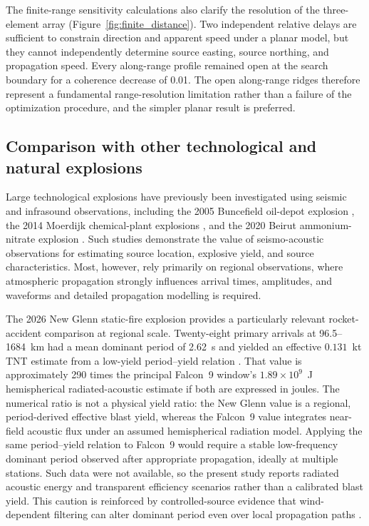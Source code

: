 \documentclass[]{seismica}
\begin{document}
The finite-range sensitivity calculations also clarify the resolution of the
three-element array (Figure~\ref{fig:finite_distance}). Two independent
relative delays are sufficient to constrain direction and apparent speed under
a planar model, but they cannot independently determine source easting, source
northing, and propagation speed. Every along-range profile remained open at
the search boundary for a coherence decrease of 0.01. The open along-range
ridges therefore represent a fundamental range-resolution limitation rather
than a failure of the optimization procedure, and the simpler planar result is
preferred.

\subsection{Comparison with other technological and natural explosions}
\label{sec:discussion_comparison}

Large technological explosions have previously been investigated using
seismic and infrasound observations, including the 2005 Buncefield oil-depot
explosion \citep{ottemoller_2008,green_2008,ceranna_2009}, the 2014 Moerdijk
chemical-plant explosions \citep{smink_2019}, and the 2020 Beirut
ammonium-nitrate explosion
\citep{pilger_beirut_2021,kim_pasyanos_2022}. Such studies demonstrate the value of seismo-acoustic observations for estimating source location, explosive yield, and source characteristics. Most, however, rely primarily on regional observations, where atmospheric propagation strongly influences arrival times, amplitudes, and waveforms and detailed propagation modelling is required.

The 2026 New Glenn static-fire explosion provides a particularly relevant
rocket-accident comparison at regional scale. Twenty-eight primary arrivals at
96.5--1684~km had a mean dominant period of 2.62~s and yielded an effective
$0.131$~kt TNT estimate from a low-yield period--yield relation
\citep{silber_scamfer_newglenn_2026}. That value is approximately 290 times the
principal Falcon~9 window's $1.89\times10^9$~J hemispherical radiated-acoustic
estimate if both are expressed in joules. The numerical ratio is not a physical
yield ratio: the New Glenn value is a regional, period-derived effective blast
yield, whereas the Falcon~9 value integrates near-field acoustic flux under an
assumed hemispherical radiation model. Applying the same period--yield relation
to Falcon~9 would require a stable low-frequency dominant period observed after
appropriate propagation, ideally at multiple stations. Such data were not
available, so the present study reports radiated acoustic energy and transparent
efficiency scenarios rather than a calibrated blast yield. This caution is
reinforced by controlled-source evidence that wind-dependent filtering can
alter dominant period even over local propagation paths
\citep{silber_wind_filtering_2026}.
\end{document}
